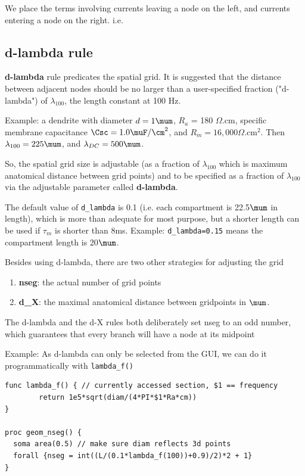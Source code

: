We place the terms involving currents leaving a node on the left, and currents
entering a node on the right. i.e.




\subsection{d-lambda rule}
\label{sec:d-lambda-NEURON}
\label{sec:lambda-rule-NEURON}

{\bf d-lambda} rule predicates the spatial grid.
It is suggested that the distance between adjacent nodes should be no larger
than a user-specified fraction ("d-lambda") of $\lambda_{100}$, the length
constant at 100 Hz.

Example: a dendrite with diameter $d=1 \mum$, $R_a$ = 180 $\Omega$.cm, 
specific membrane capacitance $\Csc = 1.0 \muF/\cm^2$, and $R_m = 16,000
\Omega$.cm$^2$. Then $\lambda_{100} = 225 \mum$, and $\lambda_{DC} = 500 \mum$.

So, the spatial grid size is adjustable (as a fraction of $\lambda_{100}$
which is maximum anatomical distance between grid points) and to be specified as
a fraction of $\lambda_{100}$ via the adjustable parameter called {\bf
d-lambda}.

The default value of  \verb!d_lambda! is 0.1 (i.e. each compartment is
22.5$\mum$ in length), which is more than adequate for most purpose, but a
shorter length can be used if $\tau_m$ is shorter than 8ms. Example:
\verb!d_lambda=0.15! means the compartment length is 20$\mum$.

Besides using d-lambda, there are two other strategies for adjusting the
grid
\begin{enumerate}
  \item {\bf nseg}: the actual number of grid points
  
  \item {\bf d\_X}: the maximal anatomical distance between gridpoints in
  $\mum$.
\end{enumerate}
The d-lambda and the d-X  rules both deliberately set 
nseg to an odd number, which guarantees that every branch will have a node
 at its midpoint

Example: As d-lambda can only be selected from the GUI, we can do it
programmatically with \verb!lambda_f()!
\begin{verbatim}
func lambda_f() { // currently accessed section, $1 == frequency
        return 1e5*sqrt(diam/(4*PI*$1*Ra*cm))
}

proc geom_nseg() {
  soma area(0.5) // make sure diam reflects 3d points
  forall {nseg = int((L/(0.1*lambda_f(100))+0.9)/2)*2 + 1}
}
\end{verbatim}



